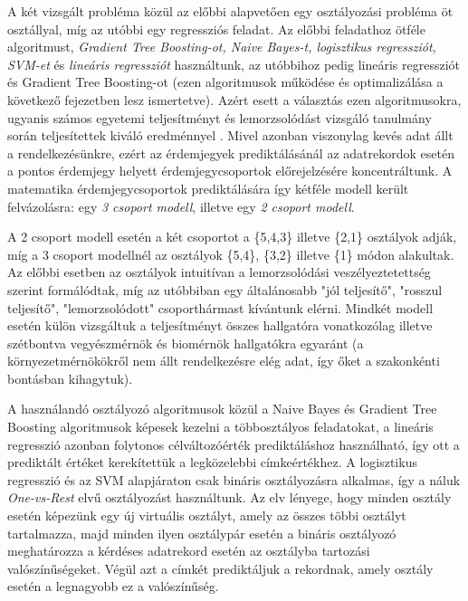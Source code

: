 \documentclass[12pt]{article}
\begin{document}
A két vizsgált probléma közül az előbbi alapvetően egy osztályozási probléma öt osztállyal, míg az utóbbi egy regressziós feladat. Az előbbi feladathoz ötféle algoritmust, \textit{Gradient Tree Boosting-ot, Naive Bayes-t, logisztikus regressziót, SVM-et} és \textit{lineáris regressziót} használtunk, az utóbbihoz pedig lineáris regressziót és Gradient Tree Boosting-ot (ezen algoritmusok működése és optimalizálása a következő fejezetben lesz ismertetve). Azért esett a választás ezen algoritmusokra, ugyanis számos egyetemi teljesítményt és lemorzsolódást vizsgáló tanulmány során teljesítettek kiváló eredménnyel \cite{modeling1, modeling2, modeling3, modeling4}. Mivel azonban viszonylag kevés adat állt a rendelkezésünkre, ezért az érdemjegyek prediktálásánál az adatrekordok esetén a pontos érdemjegy helyett érdemjegycsoportok előrejelzésére koncentráltunk. A matematika érdemjegycsoportok prediktálására így kétféle modell került felvázolásra: egy \textit{3 csoport modell}, illetve egy \textit{2 csoport modell}.

A 2 csoport modell esetén a két csoportot a \{5,4,3\} illetve \{2,1\} osztályok adják, míg a 3 csoport modellnél az osztályok \{5,4\}, \{3,2\} illetve \{1\} módon alakultak. Az előbbi esetben az osztályok intuitívan a lemorzsolódási veszélyeztetettség szerint formálódtak, míg az utóbbiban egy általánosabb "jól teljesítő", "rosszul teljesítő", "lemorzsolódott" csoporthármast kívántunk elérni. Mindkét modell esetén külön vizsgáltuk a teljesítményt összes hallgatóra vonatkozólag illetve szétbontva vegyészmérnök és biomérnök hallgatókra egyaránt (a környezetmérnökökről nem állt rendelkezésre elég adat, így őket a szakonkénti bontásban kihagytuk).

A használandó osztályozó algoritmusok közül a Naive Bayes és Gradient Tree Boosting algoritmusok képesek kezelni a többosztályos feladatokat, a lineáris regresszió azonban folytonos célváltozóérték prediktáláshoz használható, így ott a prediktált értéket kerekítettük a legközelebbi címkeértékhez. A logisztikus regresszió és az SVM alapjáraton csak bináris osztályozásra alkalmas, így a náluk \textit{One-vs-Rest} elvű osztályozást használtunk. Az elv lényege, hogy minden osztály esetén képezünk egy új virtuális osztályt, amely az összes többi osztályt tartalmazza, majd minden ilyen osztálypár esetén a bináris osztályozó meghatározza a kérdéses adatrekord esetén az osztályba tartozási valószínűségeket. Végül azt a címkét prediktáljuk a rekordnak, amely osztály esetén a legnagyobb ez a valószínűség. 
\end{document}
